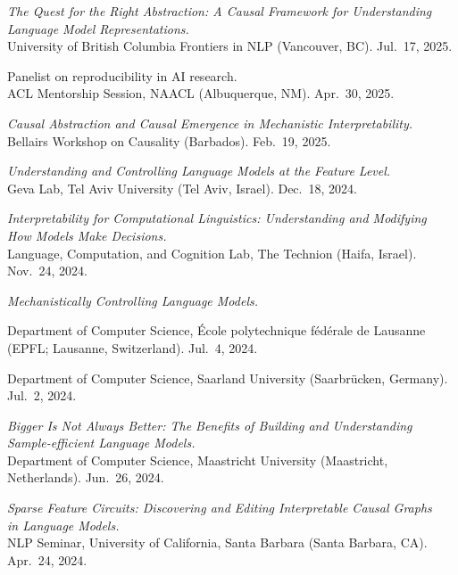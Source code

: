 \documentclass[10pt]{article}
\newcommand{\halfblankline}{\quad\vspace{-0.5\baselineskip}\pagebreak[3]}
\begin{document}
	\halfblankline
	
	\emph{The Quest for the Right Abstraction: A Causal Framework for Understanding Language Model Representations.}\\
	University of British Columbia Frontiers in NLP (Vancouver, BC). Jul.\ 17, 2025.
	
	\halfblankline
	
	Panelist on reproducibility in AI research.\\
	ACL Mentorship Session, NAACL (Albuquerque, NM). Apr.\ 30, 2025.
	
	\halfblankline
	
	\emph{Causal Abstraction and Causal Emergence in Mechanistic Interpretability.}\\
	Bellairs Workshop on Causality (Barbados). Feb.\ 19, 2025.

	\halfblankline

	\emph{Understanding and Controlling Language Models at the Feature Level.}\\
	Geva Lab, Tel Aviv University (Tel Aviv, Israel). Dec.\ 18, 2024.

	\halfblankline

	\emph{Interpretability for Computational Linguistics: Understanding and Modifying\\How Models Make Decisions.}\\
	Language, Computation, and Cognition Lab, The Technion (Haifa, Israel). Nov.\ 24, 2024.

	\halfblankline

	\emph{Mechanistically Controlling Language Models.}
	\begin{innerlist}
	\item Department of Computer Science, École polytechnique fédérale de Lausanne (EPFL; Lausanne, Switzerland). Jul.\ 4, 2024.
	\item Department of Computer Science, Saarland University (Saarbrücken, Germany). Jul.\ 2, 2024.
	\end{innerlist}
	
	\halfblankline
	
	\emph{Bigger Is Not Always Better: The Benefits of Building and Understanding\\Sample-efficient Language Models.}\\Department of Computer Science, Maastricht University (Maastricht, Netherlands). Jun.\ 26, 2024.
	
	\halfblankline

	\emph{Sparse Feature Circuits: Discovering and Editing Interpretable Causal Graphs\\in Language Models.}\\NLP Seminar, University of California, Santa Barbara (Santa Barbara, CA). Apr.\ 24, 2024.
\end{document}
